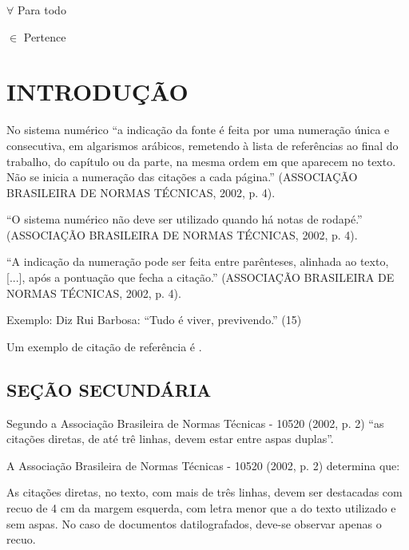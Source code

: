 \documentclass[
        12pt,
        openany, %
        oneside, %
        a4paper,
        english,
        brazil			        %
        ]{abntbibufjf}
\begin{document}
\begin{simbolos} %
  \item[$ \forall $] Para todo
  \item[$ \in $] Pertence
 \end{simbolos}


\tableofcontents*
\cleardoublepage



\textual
\pagestyle{simple}


\chapter{INTRODU\c{C}\~AO}  %

No sistema num\'erico ``a indica\c{c}\~ao da fonte \'e feita por uma numera\c{c}\~ao \'unica e consecutiva,
em algarismos ar\'abicos, remetendo \`a lista de refer\^encias ao final do trabalho,
do cap\'itulo ou da parte, na mesma ordem em que aparecem no texto.
N\~ao se inicia  a numera\c{c}\~ao das cita\c{c}\~oes a cada p\'agina.''
(ASSOCIA\c{C}\~AO BRASILEIRA DE NORMAS T\'ECNICAS, 2002, p. 4).

``O sistema num\'erico n\~ao deve ser utilizado quando h\'a notas de rodap\'e.''
(ASSOCIA\c{C}\~AO BRASILEIRA DE NORMAS T\'ECNICAS, 2002, p. 4).

``A indica\c{c}\~ao da numera\c{c}\~ao pode ser feita entre par\^enteses, alinhada ao texto, [...],
ap\'os a pontua\c{c}\~ao que fecha a cita\c{c}\~ao.''
(ASSOCIA\c{C}\~AO BRASILEIRA DE NORMAS T\'ECNICAS, 2002, p. 4).

Exemplo: Diz Rui Barbosa: ``Tudo \'e viver, previvendo.''  (15)

Um exemplo de cita\c{c}\~ao de refer\^encia \'e \cite{Ackerman1984}.
\section{SE\c{C}\~AO SECUND\'ARIA} %

Segundo a Associa\c{c}\~ao Brasileira de Normas T\'ecnicas - 10520 (2002, p. 2)
``as cita\c{c}\~oes diretas, de at\'e tr\^e linhas, devem estar entre aspas duplas''.

A Associa\c{c}\~ao Brasileira de Normas T\'ecnicas - 10520 (2002, p. 2) determina que:
\begin{citacao}
As cita\c{c}\~oes diretas, no texto, com mais de tr\^es linhas, devem ser destacadas
com recuo de 4 cm da margem esquerda, com letra menor que a do texto utilizado
e sem aspas. No caso de documentos datilografados, deve-se observar apenas o recuo.
\end{citacao}
\end{document}
